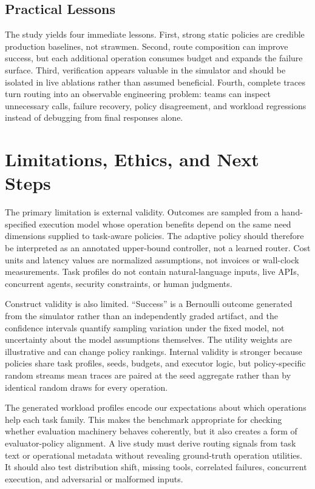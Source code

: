 \documentclass[sigconf]{acmart}
\begin{document}
\subsection{Practical Lessons}

The study yields four immediate lessons. First, strong static policies are credible production baselines, not strawmen. Second, route composition can improve success, but each additional operation consumes budget and expands the failure surface. Third, verification appears valuable in the simulator and should be isolated in live ablations rather than assumed beneficial. Fourth, complete traces turn routing into an observable engineering problem: teams can inspect unnecessary calls, failure recovery, policy disagreement, and workload regressions instead of debugging from final responses alone.

\section{Limitations, Ethics, and Next Steps}

The primary limitation is external validity. Outcomes are sampled from a hand-specified execution model whose operation benefits depend on the same need dimensions supplied to task-aware policies. The adaptive policy should therefore be interpreted as an annotated upper-bound controller, not a learned router. Cost units and latency values are normalized assumptions, not invoices or wall-clock measurements. Task profiles do not contain natural-language inputs, live APIs, concurrent agents, security constraints, or human judgments.

Construct validity is also limited. ``Success'' is a Bernoulli outcome generated from the simulator rather than an independently graded artifact, and the confidence intervals quantify sampling variation under the fixed model, not uncertainty about the model assumptions themselves. The utility weights are illustrative and can change policy rankings. Internal validity is stronger because policies share task profiles, seeds, budgets, and executor logic, but policy-specific random streams mean traces are paired at the seed aggregate rather than by identical random draws for every operation.

The generated workload profiles encode our expectations about which operations help each task family. This makes the benchmark appropriate for checking whether evaluation machinery behaves coherently, but it also creates a form of evaluator-policy alignment. A live study must derive routing signals from task text or operational metadata without revealing ground-truth operation utilities. It should also test distribution shift, missing tools, correlated failures, concurrent execution, and adversarial or malformed inputs.
\end{document}
